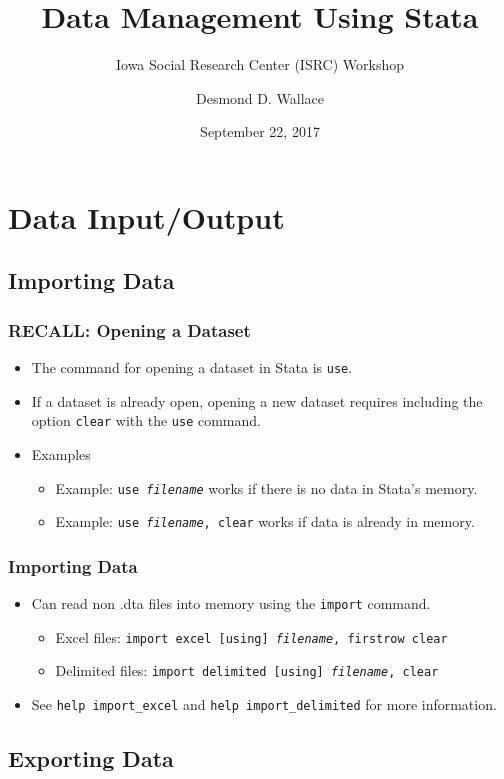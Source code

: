 \documentclass{beamer}
\title[Data Management Using Stata]{Data Management Using Stata}
\subtitle[ISRC Workshop]{Iowa Social Research Center (ISRC) Workshop}
\author[Wallace]{Desmond D. Wallace}
\institute[University of Iowa]{Department of Political Science\\The University of Iowa\\Iowa City, IA}
\date{September 22, 2017}
\begin{document}
	
\begin{frame}
	\titlepage
\end{frame}

\section{Data Input/Output}
\subsection{Importing Data}

\begin{frame}
	\frametitle{RECALL: Opening a Dataset}
		\begin{itemize}
			\item The command for opening a dataset in Stata is \texttt{use}.
			\item If a dataset is already open, opening a new dataset requires including the option \texttt{clear} with the \texttt{use} command.
			\item Examples
				\begin{itemize}
					\item Example: \texttt{use \textit{filename}} works if there is no data in Stata's memory.
					\item Example: \texttt{use \textit{filename}, clear} works if data is already in memory.
				\end{itemize}
		\end{itemize}
\end{frame}

\begin{frame}
	\frametitle{Importing Data}
		\begin{itemize}
			\item Can read non .dta files into memory using the \texttt{import} command.
				\begin{itemize}
					\item Excel files: \texttt{import excel [using] \textit{filename}, firstrow clear}
					\item Delimited files: \texttt{import delimited [using] \textit{filename}, clear}
				\end{itemize}
			\item See \texttt{help import\_{excel}} and \texttt{help import\_{delimited}} for more information.
		\end{itemize}
\end{frame}

\subsection{Exporting Data}
\end{document}
